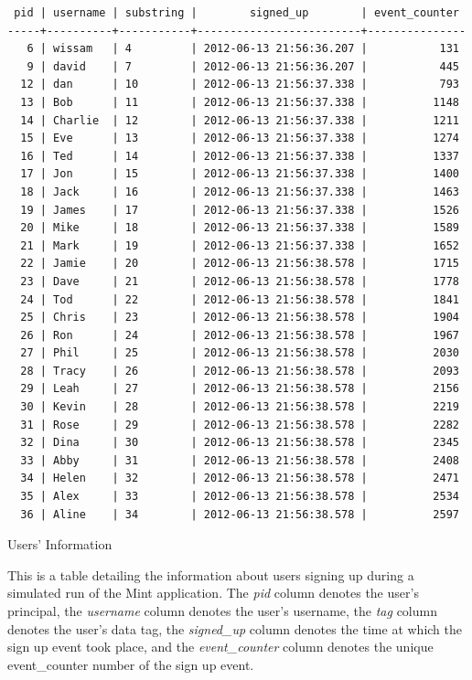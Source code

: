 \begin{table}
\begin{verbatim}
 pid | username | substring |        signed_up        | event_counter 
-----+----------+-----------+-------------------------+---------------
   6 | wissam   | 4         | 2012-06-13 21:56:36.207 |           131
   9 | david    | 7         | 2012-06-13 21:56:36.207 |           445
  12 | dan      | 10        | 2012-06-13 21:56:37.338 |           793
  13 | Bob      | 11        | 2012-06-13 21:56:37.338 |          1148
  14 | Charlie  | 12        | 2012-06-13 21:56:37.338 |          1211
  15 | Eve      | 13        | 2012-06-13 21:56:37.338 |          1274
  16 | Ted      | 14        | 2012-06-13 21:56:37.338 |          1337
  17 | Jon      | 15        | 2012-06-13 21:56:37.338 |          1400
  18 | Jack     | 16        | 2012-06-13 21:56:37.338 |          1463
  19 | James    | 17        | 2012-06-13 21:56:37.338 |          1526
  20 | Mike     | 18        | 2012-06-13 21:56:37.338 |          1589
  21 | Mark     | 19        | 2012-06-13 21:56:37.338 |          1652
  22 | Jamie    | 20        | 2012-06-13 21:56:38.578 |          1715
  23 | Dave     | 21        | 2012-06-13 21:56:38.578 |          1778
  24 | Tod      | 22        | 2012-06-13 21:56:38.578 |          1841
  25 | Chris    | 23        | 2012-06-13 21:56:38.578 |          1904
  26 | Ron      | 24        | 2012-06-13 21:56:38.578 |          1967
  27 | Phil     | 25        | 2012-06-13 21:56:38.578 |          2030
  28 | Tracy    | 26        | 2012-06-13 21:56:38.578 |          2093
  29 | Leah     | 27        | 2012-06-13 21:56:38.578 |          2156
  30 | Kevin    | 28        | 2012-06-13 21:56:38.578 |          2219
  31 | Rose     | 29        | 2012-06-13 21:56:38.578 |          2282
  32 | Dina     | 30        | 2012-06-13 21:56:38.578 |          2345
  33 | Abby     | 31        | 2012-06-13 21:56:38.578 |          2408
  34 | Helen    | 32        | 2012-06-13 21:56:38.578 |          2471
  35 | Alex     | 33        | 2012-06-13 21:56:38.578 |          2534
  36 | Aline    | 34        | 2012-06-13 21:56:38.578 |          2597
\end{verbatim}
\caption*{Users' Information}
\caption[Mint Users Information]{This is a table detailing the information about users signing up during a simulated run of the Mint application. The \emph{pid} column denotes the user's principal, the \emph{username} column denotes the user's username, the \emph{tag} column denotes the user's data tag, the \emph{signed\_up} column denotes the time at which the sign up event took place, and the \emph{event\_counter} column denotes the unique event\_counter number of the sign up event.}
\label{table:users-info}
\end{table}

